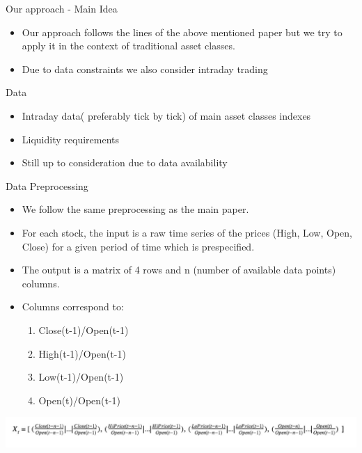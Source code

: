 \documentclass[10pt]{beamer}
\begin{document}
\begin{frame}{Our approach - Main Idea}
\begin{itemize}
    \item Our approach follows the lines of the above mentioned paper but we try to apply it in the context of traditional asset classes.
    \item Due to data constraints we also consider intraday trading
\end{itemize}
\end{frame}

\begin{frame}{Data}
\begin{itemize}
    \item Intraday data( preferably tick by tick) of main asset classes indexes 
    \item Liquidity requirements
    \item Still up to consideration due to data availability
\end{itemize}
\end{frame}



\begin{frame}{ Data Preprocessing}
\begin{itemize}
    \item We follow the same preprocessing as the main paper.
    \item For each stock, the input is a raw time series of the prices (High, Low, Open, Close) for a given period of time which is prespecified.
    \item The output is a matrix of 4 rows and n (number of available data points) columns.
    \item Columns correspond to:
    \begin{enumerate}
        \item Close(t-1)/Open(t-1)
        \item High(t-1)/Open(t-1)
        \item Low(t-1)/Open(t-1)
        \item Open(t)/Open(t-1)
    \end{enumerate}
\end{itemize}
\includegraphics[width=\textwidth]{Presentation/inputTensor.png}
\end{frame}
\end{document}
